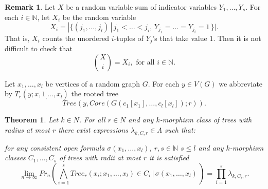 \documentclass[11pt,notitlepage]{report}
\newtheorem{theorem}{Theorem}[chapter]
\theoremstyle{definition}
\newtheorem{remark}{Remark}[chapter]
\newcommand{\N}{\mathbb{N}}
\newcommand{\Ln}{\lim\limits_{n\to \infty}}
\begin{document}
\begin{remark}
	Let $X$ be a random variable sum of indicator variables
	$Y_1, \dots, Y_s$. For each $i\in \N$, let 
	$X_i$ be the random variable
	\[X_i= |\{ (j_1,\dots, j_l)\, | \, j_1<\dots<j_i, \, Y_{j_1}=
	\dots = Y_{j_i}=1 \, \}|.\]
	That is, $X_i$ counts the unordered $i$-tuples of $Y_j$'s that 
	take value $1$. Then it is not difficult to check that
	\[ \binom{X}{i}= X_i, \text{ for all } i\in \N. \] 
\end{remark}

Let $x_1, \dots, x_l$ be vertices of a random graph $G$.
For each $y\in V(G)$ we abbreviate by $T_r(y; x,1_,\dots, x_l)$
the rooted tree 
\[Tree(y, Core(G(c_1[x_1],\dots, c_l[x_l]);r)).\]

\begin{theorem} \label{thm:probtrees}
	Let $k\in N$. 
    For all $r\in N$ and any $k$-morphism class of trees with radius
	at most $r$ there exist expressions $\lambda_{k,C,r}\in \Lambda$ 
	such that:
	\item for any consistent open formula $\sigma(x_1,\dots, x_l)$, $r,s\in \N$ $s\leq l$ and any $k$-morphism classes $C_1, 
	\dots, C_s$ of trees with radii
	at most $r$ it is satisfied
	\[ \Ln Pr_n(\bigwedge_{i=1}^s Tree_r(x_i; x_1, \dots, x_l)\in C_i \, | 
	\, \sigma(x_1,\dots, x_l) \,)= \prod_ {i=1}^s \lambda_{k,C_i,r}.\]	
\end{theorem}
\end{document}
